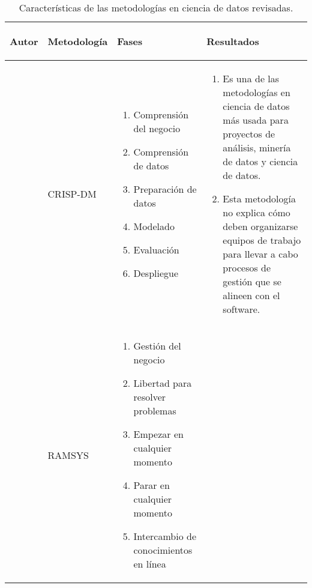 \begin{table*} [!htb]
	\footnotesize
	\begin{threeparttable}
		\caption{Características de las metodologías en ciencia de datos revisadas.}
		\label{metodologias}
		\begin{tabular}{p{1cm} p{2cm} p{5cm} p{6.5cm}} \toprule	
			\begin{center}Autor\end{center}   
			&\begin{center}Metodología\end{center}             
			&\begin{center}Fases\end{center}      
			&\begin{center}Resultados\end{center}  
			\\ \hline	
			\cite{Schroer2021}
			&CRISP-DM
			& \begin{enumerate}
				\item Comprensión del negocio
				\item Comprensión de datos
				\item Preparación de datos
				\item Modelado
				\item Evaluación
				\item Despliegue 
			\end{enumerate}
			& \begin{enumerate}
				\item Es una de las metodologías en ciencia de datos más usada para proyectos de análisis, minería de datos y ciencia de datos.
				\item Esta metodología no explica cómo deben organizarse equipos de trabajo para llevar a cabo procesos de gestión que se alineen con el software.
			\end{enumerate}
			\\ \hline
			\cite{Mladenic2012}
			&RAMSYS
			& \begin{enumerate}
				\item Gestión del negocio
				\item Libertad para resolver problemas
				\item Empezar en cualquier momento
				\item Parar en cualquier momento
				\item Intercambio de conocimientos en línea 

\end{enumerate}
\end{tabular}
\end{threeparttable}
\end{table*}
